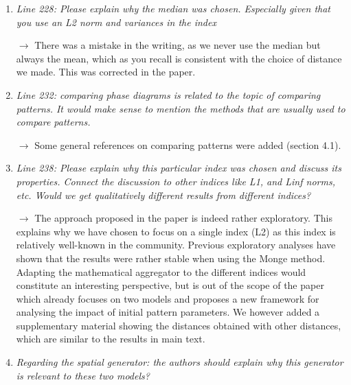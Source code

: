 \documentclass[11pt,a4paper,sans]{moderncv}        %
\begin{document}
\begin{enumerate}
	
	\item \textit{Line 228: Please explain why the median was chosen. Especially given that you use an L2 norm and variances in the index}
    
    \medskip
    
    $\rightarrow$ There was a mistake in the writing, as we never use the median but always the mean, which as you recall is consistent with the choice of distance we made. This was corrected in the paper.
	
	\bigskip
	
	
	\item \textit{Line 232: comparing phase diagrams is related to the topic of comparing patterns. It would make sense to mention the methods that are usually used to compare patterns.}
	
	\medskip
	
	$\rightarrow$ Some general references on comparing patterns were added (section 4.1).
	\bigskip
	
	\item \textit{Line 238: Please explain why this particular index was chosen and discuss its properties. Connect the discussion to other indices like L1, and Linf norms, etc. Would we get qualitatively different results from different indices? }
	\medskip
	
	$\rightarrow$ The approach proposed in the paper is indeed rather exploratory. This explains why we have chosen to focus on a single index (L2) as this index is relatively well-known in the community. Previous exploratory analyses have shown that the results were rather stable when using the Monge method. Adapting the mathematical aggregator to the different indices would constitute an interesting perspective, but is out of the scope of the paper which already focuses on two models and proposes a new framework for analysing the impact of initial pattern parameters. We however added a supplementary material showing the distances obtained with other distances, which are similar to the results in main text.
	\bigskip
	
	\item \textit{Regarding the spatial generator: the authors should explain why this generator is relevant to these two models?}
	
	\medskip
	

\end{enumerate}
\end{document}
